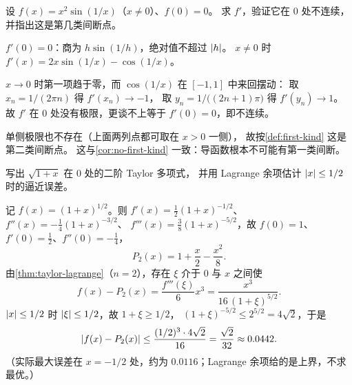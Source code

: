 \begin{exercise}[例行]
  \label{exr:wiggle-derivative}
  设 \(f(x)=x^{2}\sin(1/x)\)（\(x \neq 0\)）、\(f(0)=0\)。
  求 \(f'\)，验证它在 \(0\) 处不连续，并指出这是第几类间断点。
  \begin{solution}
    \(f'(0)=0\)：商为 \(h\sin(1/h)\)，绝对值不超过 \(\lvert h\rvert\)。
    \(x \neq 0\) 时 \(f'(x) = 2x\sin(1/x) - \cos(1/x)\)。

    \(x \to 0\) 时第一项趋于零，而 \(\cos(1/x)\) 在 \([-1,1]\) 中来回摆动：
    取 \(x_{n}=1/(2\pi n)\) 得 \(f'(x_{n}) \to -1\)，
    取 \(y_{n}=1/\bigl((2n+1)\pi\bigr)\) 得 \(f'(y_{n}) \to 1\)。
    故 \(f'\) 在 \(0\) 处没有极限，更谈不上等于 \(f'(0)=0\)，即不连续。

    单侧极限也不存在（上面两列点都可取在 \(x>0\) 一侧），
    故按\cref{def:first-kind} 这是第二类间断点。
    这与\cref{cor:no-first-kind} 一致：导函数根本不可能有第一类间断。
  \end{solution}
\end{exercise}

\begin{exercise}[例行]
  \label{exr:taylor-sqrt}
  写出 \(\sqrt{1+x}\) 在 \(0\) 处的二阶 Taylor 多项式，
  并用 Lagrange 余项估计 \(\lvert x\rvert \le 1/2\) 时的逼近误差。
  \begin{solution}
    记 \(f(x)=(1+x)^{1/2}\)。则
    \(f'(x)=\tfrac12(1+x)^{-1/2}\)、\(f''(x)=-\tfrac14(1+x)^{-3/2}\)、
    \(f'''(x)=\tfrac38(1+x)^{-5/2}\)，故 \(f(0)=1\)、\(f'(0)=\tfrac12\)、\(f''(0)=-\tfrac14\)，
    \[
      P_{2}(x) = 1 + \frac{x}{2} - \frac{x^{2}}{8} .
    \]
    由\cref{thm:taylor-lagrange}（\(n=2\)），存在 \(\xi\) 介于 \(0\) 与 \(x\) 之间使
    \[
      f(x)-P_{2}(x) = \frac{f'''(\xi)}{6}x^{3}
        = \frac{x^{3}}{16\,(1+\xi)^{5/2}} .
    \]
    \(\lvert x\rvert \le 1/2\) 时 \(\lvert\xi\rvert \le 1/2\)，故 \(1+\xi \ge 1/2\)，
    \((1+\xi)^{-5/2} \le 2^{5/2}=4\sqrt2\)，于是
    \[
      \lvert f(x)-P_{2}(x)\rvert \le \frac{(1/2)^{3} \cdot 4\sqrt2}{16} = \frac{\sqrt2}{32} \approx 0.0442 .
    \]
    （实际最大误差在 \(x=-1/2\) 处，约为 \(0.0116\)；Lagrange 余项给的是上界，不求最优。）
  \end{solution}
\end{exercise}

